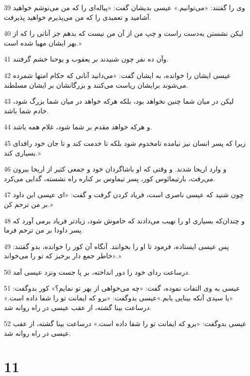 \par 39 وی را گفتند: «می‌توانیم.» عیسی بدیشان گفت: «پیاله‌ای را که من می‌نوشم خواهید آشامید و تعمیدی را که من می‌پذیرم خواهید پذیرفت.
\par 40 لیکن نشستن به‌دست راست و چپ من از آن من نیست که بدهم جز آنانی را که از بهر ایشان مهیا شده است.»
\par 41 وآن ده نفر چون شنیدند بر یعقوب و یوحنا خشم گرفتند.
\par 42 عیسی ایشان را خوانده، به ایشان گفت: «می‌دانید آنانی که حکام امتها شمرده می‌شوند برایشان ریاست می‌کنند و بزرگانشان بر ایشان مسلطند.
\par 43 لیکن در میان شما چنین نخواهد بود، بلکه هر‌که خواهد در میان شما بزرگ شود، خادم شما باشد.
\par 44 و هر‌که خواهد مقدم بر شما شود، غلام همه باشد.
\par 45 زیرا که پسر انسان نیز نیامده تامخدوم شود بلکه تا خدمت کند و تا جان خود رافدای بسیاری کند.»
\par 46 و وارد اریحا شدند. و وقتی که او باشاگردان خود و جمعی کثیر از اریحا بیرون می‌رفت، بارتیمائوس کور، پسر تیماوس بر کناره راه نشسته، گدایی می‌کرد.
\par 47 چون شنید که عیسی ناصری است، فریاد کردن گرفت و گفت: «ای عیسی ابن داود بر من ترحم کن.»
\par 48 و چندان‌که بسیاری او را نهیب می‌دادند که خاموش شود، زیادتر فریاد برمی آورد که پسر داودا بر من ترحم فرما.
\par 49 پس عیسی ایستاده، فرمود تا او را بخوانند. آنگاه آن کور را خوانده، بدو گفتند: «خاطر جمع دار برخیز که تو را می‌خواند.»
\par 50 درساعت ردای خود را دور انداخته، بر پا جست ونزد عیسی آمد.
\par 51 عیسی به وی التفات نموده، گفت: «چه می‌خواهی از بهر تو نمایم؟» کور بدوگفت: «یا سیدی آنکه بینایی یابم.»عیسی بدوگفت: «برو که ایمانت تو را شفا داده است.» درساعت بینا گشته، از عقب عیسی در راه روانه شد.
\par 52 عیسی بدوگفت: «برو که ایمانت تو را شفا داده است.» درساعت بینا گشته، از عقب عیسی در راه روانه شد.

\chapter{11}

